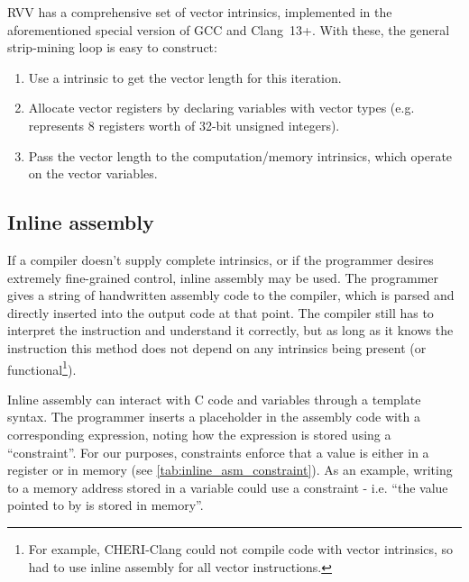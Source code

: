 
RVV has a comprehensive set of vector intrinsics, implemented in the aforementioned special version of GCC and Clang~13+.
With these, the general strip-mining loop is easy to construct:
\begin{enumerate}
    \item Use a  intrinsic to get the vector length for this iteration.
    \item Allocate vector registers by declaring variables with vector types (e.g.  represents 8 registers worth of 32-bit unsigned integers).
    \item Pass the vector length to the computation/memory intrinsics, which operate on the vector variables.
\end{enumerate}


\subsection{Inline assembly}
If a compiler doesn't supply complete intrinsics, or if the programmer desires extremely fine-grained control, inline assembly may be used.
The programmer gives a string of handwritten assembly code to the compiler, which is parsed and directly inserted into the output code at that point.
The compiler still has to interpret the instruction and understand it correctly, but as long as it knows the instruction this method does not depend on any intrinsics being present (or functional\footnote{For example, CHERI-Clang could not compile code with vector intrinsics, so had to use inline assembly for all vector instructions.}).

Inline assembly can interact with C code and variables through a template syntax.
The programmer inserts a placeholder in the assembly code with a corresponding expression, noting how the expression is stored using a \enquote{constraint}.
For our purposes, constraints enforce that a value is either in a register or in memory (see \cref{tab:inline_asm_constraint}).
As an example, writing to a memory address stored in a variable could use a constraint  - i.e. \enquote{the value pointed to by  is stored in memory}.  


